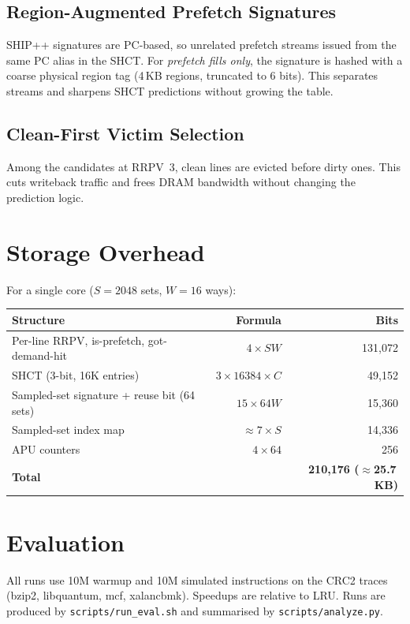\documentclass[11pt]{article}
\begin{document}
\subsection{Region-Augmented Prefetch Signatures}
SHIP++ signatures are PC-based, so unrelated prefetch streams issued from the same PC
alias in the SHCT. For \emph{prefetch fills only}, the signature is hashed with a coarse
physical region tag (4\,KB regions, truncated to 6 bits). This separates streams and
sharpens SHCT predictions without growing the table.

\subsection{Clean-First Victim Selection}
Among the candidates at RRPV~3, clean lines are evicted before dirty ones. This cuts
writeback traffic and frees DRAM bandwidth without changing the prediction logic.

\section{Storage Overhead}
For a single core ($S = 2048$ sets, $W = 16$ ways):
\begin{center}
\begin{tabular}{lrr}
  \toprule
  Structure & Formula & Bits \\
  \midrule
  Per-line RRPV, is-prefetch, got-demand-hit & $4 \times S W$ & 131{,}072 \\
  SHCT (3-bit, 16K entries)                 & $3 \times 16384 \times C$ & 49{,}152 \\
  Sampled-set signature + reuse bit (64 sets) & $15 \times 64 W$ & 15{,}360 \\
  Sampled-set index map                      & $\approx 7 \times S$ & 14{,}336 \\
  APU counters                               & $4 \times 64$ & 256 \\
  \midrule
  \textbf{Total} & & \textbf{210{,}176 ($\approx$25.7\,KB)} \\
  \bottomrule
\end{tabular}
\end{center}

\section{Evaluation}
All runs use 10M warmup and 10M simulated instructions on the CRC2 traces
(bzip2, libquantum, mcf, xalancbmk). Speedups are relative to LRU. Runs are produced by \texttt{scripts/run\_eval.sh} and
summarised by \texttt{scripts/analyze.py}.
\end{document}
